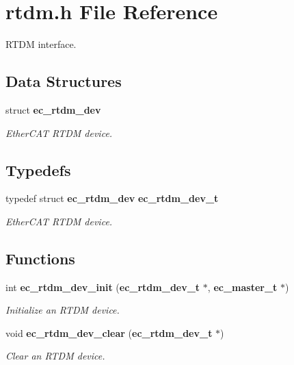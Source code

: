 \section{rtdm.\-h File Reference}
\label{rtdm_8h}


R\-T\-D\-M interface.  


\subsection*{Data Structures}
\begin{DoxyCompactItemize}
\item 
struct {\bf ec\-\_\-rtdm\-\_\-dev}
\begin{DoxyCompactList}\small\item\em Ether\-C\-A\-T R\-T\-D\-M device. \end{DoxyCompactList}\end{DoxyCompactItemize}
\subsection*{Typedefs}
\begin{DoxyCompactItemize}
\item 
typedef struct {\bf ec\-\_\-rtdm\-\_\-dev} {\bf ec\-\_\-rtdm\-\_\-dev\-\_\-t}\label{rtdm_8h_a251d14e127f7590bdf0a6a59acf07777}

\begin{DoxyCompactList}\small\item\em Ether\-C\-A\-T R\-T\-D\-M device. \end{DoxyCompactList}\end{DoxyCompactItemize}
\subsection*{Functions}
\begin{DoxyCompactItemize}
\item 
int {\bf ec\-\_\-rtdm\-\_\-dev\-\_\-init} ({\bf ec\-\_\-rtdm\-\_\-dev\-\_\-t} $\ast$, {\bf ec\-\_\-master\-\_\-t} $\ast$)
\begin{DoxyCompactList}\small\item\em Initialize an R\-T\-D\-M device. \end{DoxyCompactList}\item 
void {\bf ec\-\_\-rtdm\-\_\-dev\-\_\-clear} ({\bf ec\-\_\-rtdm\-\_\-dev\-\_\-t} $\ast$)\label{rtdm_8h_a597c8141cb50546873826975c1bc64d5}

\begin{DoxyCompactList}\small\item\em Clear an R\-T\-D\-M device. \end{DoxyCompactList}\end{DoxyCompactItemize}


